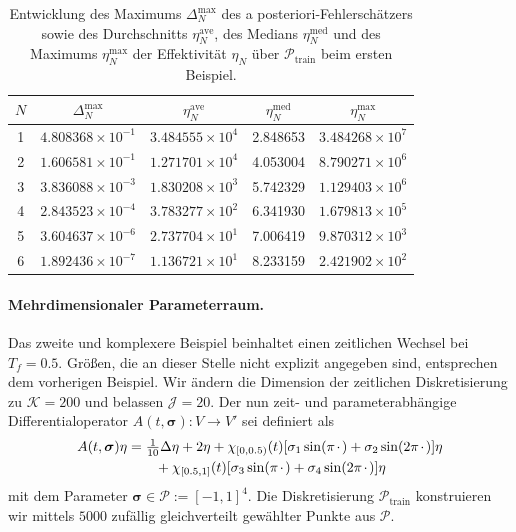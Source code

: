 \documentclass[../main.tex]{subfiles}
\begin{document}
\begin{table}[tb]
    \centering
    \begin{tabular}{|c|c|c|c|c|}\hline
     $N$ & $\Delta_{N}^{\mathrm{max}}$ & $\eta_{N}^{\mathrm{ave}}$ & $\eta_{N}^{\mathrm{med}}$ & $\eta_{N}^{\mathrm{max}}$\\ \hline
     1 & $4.808368{\times}10^{-1}$ & $3.484555{\times}10^{4}$ &  2.848653  & $3.484268{\times}10^{7}$ \\ %
     2 & $1.606581{\times}10^{-1}$ & $1.271701{\times}10^{4}$ &  4.053004  & $8.790271{\times}10^{6}$ \\ %
     3 & $3.836088{\times}10^{-3}$ & $1.830208{\times}10^{3}$ &  5.742329  & $1.129403{\times}10^{6}$ \\ %
     4 & $2.843523{\times}10^{-4}$ & $3.783277{\times}10^{2}$ &  6.341930  & $1.679813{\times}10^{5}$ \\ %
     5 & $3.604637{\times}10^{-6}$ & $2.737704{\times}10^{1}$ &  7.006419  & $9.870312{\times}10^{3}$ \\ %
     6 & $1.892436{\times}10^{-7}$ & $1.136721{\times}10^{1}$ &  8.233159  & $2.421902{\times}10^{2}$ \\ \hline
    \end{tabular}
    \caption[Entwicklung der relevanten Größen der RB"=Methode, erstes Beispiel.]{%
        Entwicklung des Maximums $\Delta_{N}^{\mathrm{max}}$ des a posteriori-Fehlerschätzers sowie des Durchschnitts $\eta_{N}^{\mathrm{ave}}$, des Medians $\eta_{N}^{\mathrm{med}}$ und des Maximums $\eta_{N}^{\mathrm{max}}$ der Effektivität $\eta_{N}$ über $\mathcal P_{\mathrm{train}}$ beim ersten Beispiel.
    }
    \label{table:entwicklung_rbm}
\end{table}

\paragraph{Mehrdimensionaler Parameterraum.} %

Das zweite und komplexere Beispiel beinhaltet einen zeitlichen Wechsel bei $T_f = 0.5$.
Größen, die an dieser Stelle nicht explizit angegeben sind, entsprechen dem vorherigen Beispiel.
Wir ändern die Dimension der zeitlichen Diskretisierung zu $\mathcal K = 200$ und belassen $\mathcal J = 20$.
Der nun zeit- und parameterabhängige Differentialoperator $A(t, \bm \sigma) \colon V \to V'$ sei definiert als
\begin{equation}
    \begin{aligned}
    A(t, \bm \sigma) \eta &=
        \tfrac{1}{10} \Delta \eta + 2 \eta + \chi_{[0, 0.5)}(t) [\sigma_1 \sin(\pi {\mkern2mu\cdot\mkern2mu}) + \sigma_2 \sin(2 \pi {\mkern2mu\cdot\mkern2mu})] \eta \\
        &\qquad + \chi_{[0.5, 1]}(t) [\sigma_3 \sin(\pi {\mkern2mu\cdot\mkern2mu}) + \sigma_4 \sin(2 \pi {\mkern2mu\cdot\mkern2mu})] \eta
    \end{aligned}
\end{equation}
mit dem Parameter $\bm \sigma \in \mathcal P := [-1, 1]^{4}$.
Die Diskretisierung $\mathcal P_{\mathrm{train}}$ konstruieren wir mittels $5000$ zufällig gleichverteilt gewählter Punkte aus $\mathcal P$.
\end{document}
